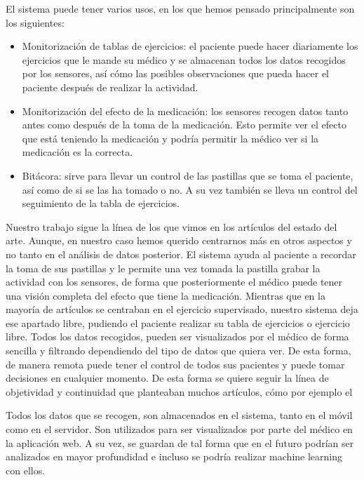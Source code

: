 \documentclass[11pt,spanish]{article}
\begin{document}
El sistema puede tener varios usos, en los que hemos pensado principalmente son los siguientes:

\begin{itemize}
	\item Monitorización de tablas de ejercicios: el paciente puede hacer diariamente los ejercicios que le mande su médico y se almacenan todos los datos recogidos por los sensores, así cómo las posibles observaciones que pueda hacer el paciente después de realizar la actividad.
    \item Monitorización del efecto de la medicación: los sensores recogen datos tanto antes como después de la toma de la medicación. Esto permite ver el efecto que está teniendo la medicación y podría permitir la médico ver si la medicación es la correcta.
    \item Bitácora: sirve para llevar un control de las pastillas que se toma el paciente, así como de si se las ha tomado o no. A su vez también se lleva un control del seguimiento de la tabla de ejercicios.
\end{itemize}

Nuestro trabajo sigue la línea de los que vimos en los artículos del estado del arte. Aunque, en nuestro caso hemos querido centrarnos más en otros aspectos y no tanto en el análisis de datos posterior. El sistema ayuda al paciente a recordar la toma de sus pastillas y le permite una vez tomada la pastilla grabar la actividad con los sensores, de forma que posteriormente el médico puede tener una visión completa del efecto que tiene la medicación. Mientras que en la mayoría de artículos se centraban en el ejercicio supervisado, nuestro sistema deja ese apartado libre, pudiendo el paciente realizar su tabla de ejercicios o ejercicio libre. Todos los datos recogidos, pueden ser visualizados por el médico de forma sencilla y filtrando dependiendo del tipo de datos que quiera ver. De esta forma, de manera remota puede tener el control de todos sus pacientes y puede tomar decisiones en cualquier momento. De esta forma se quiere seguir la línea de objetividad y continuidad que planteaban muchos artículos, cómo por ejemplo el \cite{resumen2}
\newline

Todos los datos que se recogen, son almacenados en el sistema, tanto en el móvil como en el servidor. Son utilizados para ser visualizados por parte del médico en la aplicación web. A su vez, se guardan de tal forma que en el futuro podrían ser analizados en mayor profundidad e incluso se podría realizar machine learning con ellos.
\newline
\end{document}
